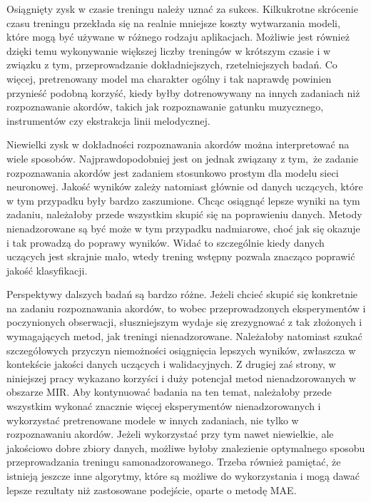 Osiągnięty zysk w czasie treningu należy uznać za sukces. Kilkukrotne skrócenie czasu treningu przekłada się na realnie mniejsze koszty wytwarzania modeli, które mogą być używane w różnego rodzaju aplikacjach. Możliwie jest również dzięki temu wykonywanie większej liczby treningów w krótszym czasie i w związku z tym, przeprowadzanie dokładniejszych, rzetelniejszych badań. Co więcej, pretrenowany model ma charakter ogólny i tak naprawdę powinien przynieść podobną korzyść, kiedy byłby dotrenowywany na innych zadaniach niż rozpoznawanie akordów, takich jak rozpoznawanie gatunku muzycznego, instrumentów czy ekstrakcja linii melodycznej.

Niewielki zysk w dokładności rozpoznawania akordów można interpretować na wiele sposobów. Najprawdopodobniej jest on jednak związany z tym, że zadanie rozpoznawania akordów jest zadaniem stosunkowo prostym dla modelu sieci neuronowej. Jakość wyników zależy natomiast głównie od danych uczących, które w tym przypadku były bardzo zaszumione. Chcąc osiągnąć lepsze wyniki na tym zadaniu, należałoby przede wszystkim skupić się na poprawieniu danych. Metody nienadzorowane są być może w tym przypadku nadmiarowe, choć jak się okazuje i tak prowadzą do poprawy wyników. Widać to szczególnie kiedy danych uczących jest skrajnie mało, wtedy trening wstępny pozwala znacząco poprawić jakość klasyfikacji.

Perspektywy dalszych badań są bardzo różne. Jeżeli chcieć skupić się konkretnie na zadaniu rozpoznawania akordów, to wobec przeprowadzonych eksperymentów i poczynionych obserwacji, słuszniejszym wydaje się zrezygnować z tak złożonych i wymagających metod, jak treningi nienadzorowane. Należałoby natomiast szukać szczegółowych przyczyn niemożności osiągnięcia lepszych wyników, zwłaszcza w kontekście jakości danych uczących i walidacyjnych. Z drugiej zaś strony, w niniejszej pracy wykazano korzyści i duży potencjał metod nienadzorowanych w obszarze MIR. Aby kontynuować badania na ten temat, należałoby przede wszystkim wykonać znacznie więcej eksperymentów nienadzorowanych i wykorzystać pretrenowane modele w innych zadaniach, nie tylko w rozpoznawaniu akordów. Jeżeli wykorzystać przy tym nawet niewielkie, ale jakościowo dobre zbiory danych, możliwe byłoby znalezienie optymalnego sposobu przeprowadzania treningu samonadzorowanego. Trzeba również pamiętać, że istnieją jeszcze inne algorytmy, które są możliwe do wykorzystania i mogą dawać lepsze rezultaty niż zastosowane podejście, oparte o metodę MAE.
